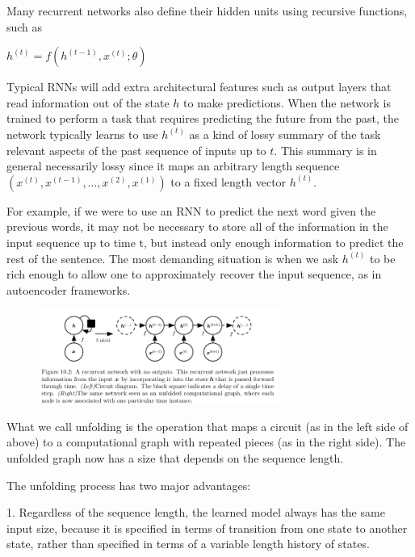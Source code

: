 \documentclass[onecolumn, letterpaper, 12pt]{report}
\begin{document}
Many recurrent networks also define their hidden units using recursive functions, such as 

\begin{center}
  $h^{(t)} = f(h^{(t-1)}, x^{(t)}; \theta)$
\end{center}

Typical RNNs will add extra architectural features such as output layers that read information out of the state $h$ to make predictions. When the network is trained to perform a task that requires predicting the future from the past, the network typically learns to use $h^{(t)}$ as a kind of lossy summary of the task relevant aspects of the past sequence of inputs up to $t$. This summary is in general necessarily lossy since it maps an arbitrary length sequence $(x^{(t)}, x^{(t-1)}, ..., x^{(2)}, x^{(1)})$ to a fixed length vector $h^{(t)}$. 

For example, if we were to use an RNN to predict the next word given the previous words, it may not be necessary to store all of the information in the input sequence up to time t, but instead only enough information to predict the rest of the sentence. The most demanding situation is when we ask $h^{(t)}$ to be rich enough to allow one to approximately recover the input sequence, as in autoencoder frameworks. 

\begin{figure}[h]
  \centering
  \includegraphics[width=0.7\textwidth]{rnn_dag.png}
\end{figure}

What we call unfolding is the operation that maps a circuit (as in the left side of above) to a computational graph with repeated pieces (as in the right side). The unfolded graph now has a size that depends on the sequence length. 

The unfolding process has two major advantages:

1. Regardless of the sequence length, the learned model always has the same input size, because it is specified in terms of transition from one state to another state, rather than specified in terms of a variable length history of states.
\end{document}
